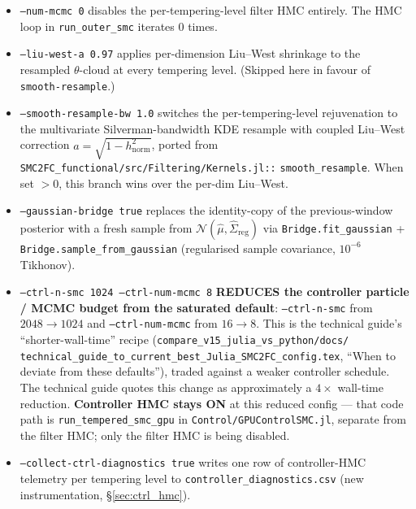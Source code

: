 \documentclass[11pt,a4paper]{article}
\begin{document}
\begin{itemize}[itemsep=2pt]
  \item \texttt{--num-mcmc 0} disables the per-tempering-level filter
        HMC entirely. The HMC loop in \texttt{run\_outer\_smc}
        iterates 0 times.
  \item \texttt{--liu-west-a 0.97} applies per-dimension Liu--West
        shrinkage to the resampled $\theta$-cloud at every tempering
        level. (Skipped here in favour of \texttt{smooth-resample}.)
  \item \texttt{--smooth-resample-bw 1.0} switches the
        per-tempering-level rejuvenation to the multivariate
        Silverman-bandwidth KDE resample with coupled Liu--West
        correction $a = \sqrt{1 - h_{\mathrm{norm}}^2}$, ported from
        \texttt{SMC2FC\_functional/src/Filtering/Kernels.jl::}
        \texttt{smooth\_resample}. When set $>0$, this branch wins
        over the per-dim Liu--West.
  \item \texttt{--gaussian-bridge true} replaces the identity-copy of
        the previous-window posterior with a fresh sample from
        $\mathcal{N}(\hat{\mu}, \hat{\Sigma}_{\mathrm{reg}})$ via
        \texttt{Bridge.fit\_gaussian} +
        \texttt{Bridge.sample\_from\_gaussian}
        (regularised sample covariance, $10^{-6}$ Tikhonov).
  \item \texttt{--ctrl-n-smc 1024 --ctrl-num-mcmc 8} \textbf{REDUCES
        the controller particle / MCMC budget from the saturated
        default}: \texttt{--ctrl-n-smc} from $2048 \to 1024$ and
        \texttt{--ctrl-num-mcmc} from $16 \to 8$. This is the
        technical guide's ``shorter-wall-time''
        recipe (\texttt{compare\_v15\_julia\_vs\_python/docs/}
        \texttt{technical\_guide\_to\_current\_best\_Julia\_SMC2FC\_config.tex},
        ``When to deviate from these defaults''), traded against a
        weaker controller schedule. The technical guide quotes this
        change as approximately a $4\times$ wall-time reduction.
        \textbf{Controller HMC stays ON} at this reduced config —
        that code path is \texttt{run\_tempered\_smc\_gpu} in
        \texttt{Control/GPUControlSMC.jl}, separate from the filter
        HMC; only the filter HMC is being disabled.
  \item \texttt{--collect-ctrl-diagnostics true} writes one row of
        controller-HMC telemetry per tempering level to
        \texttt{controller\_diagnostics.csv} (new instrumentation,
        \S\ref{sec:ctrl_hmc}).
\end{itemize}
\end{document}
